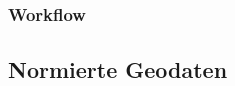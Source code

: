 \subsubsection{Workflow}
\label{sec:2 modelle}
%
%
%

\subsection{Normierte Geodaten}
\label{sec:2 modelle}
%
%
%
%
%




